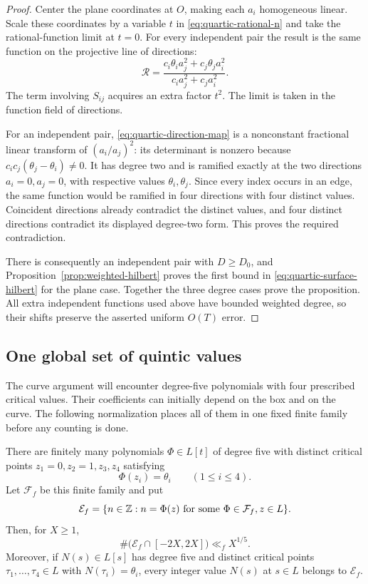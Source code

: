 \begin{proof}
Center the plane coordinates at $O$, making each $a_i$ homogeneous
linear.  Scale these coordinates by a variable $t$ in
\eqref{eq:quartic-rational-n} and take the rational-function limit at
$t=0$.  For every independent pair the result is the same function
on the projective line of directions:
\begin{equation}\label{eq:quartic-direction-map}
 \mathcal R=\frac{c_i\theta_i a_j^2+c_j\theta_j a_i^2}
          {c_i a_j^2+c_j a_i^2}.
\end{equation}
The term involving $S_{ij}$ acquires an extra factor $t^2$.
The limit is taken in the function field of directions.

For an independent pair, \eqref{eq:quartic-direction-map} is a
nonconstant fractional linear transform of $(a_i/a_j)^2$: its
determinant is nonzero because
$c_i c_j(\theta_j-\theta_i)\ne0$.  It has degree two and is ramified
exactly at the two directions $a_i=0,a_j=0$, with respective values
$\theta_i,\theta_j$.  Since every index occurs in an edge, the same
function would be ramified in four directions with four distinct
values.  Coincident directions already contradict the distinct values,
and four distinct directions contradict its displayed degree-two form.
This proves the required contradiction.

There is consequently an independent pair with $D\ge D_0$, and
Proposition~\ref{prop:weighted-hilbert} proves the first bound in
\eqref{eq:quartic-surface-hilbert} for the plane case.  Together the
three degree cases prove the proposition.  All extra independent
functions used above have bounded weighted degree, so their shifts
preserve the asserted uniform $O(T)$ error.
\end{proof}

\subsection{One global set of quintic values}

The curve argument will encounter degree-five polynomials with four
prescribed critical values.  Their coefficients can initially depend
on the box and on the curve.  The following normalization places all
of them in one fixed finite family before any counting is done.

\begin{proposition}\label{prop:quintic-discard}
There are finitely many polynomials $\Phi\in L[t]$ of degree five with
distinct critical points $z_1=0,z_2=1,z_3,z_4$ satisfying
\[
 \Phi(z_i)=\theta_i\qquad(1\le i\le4).
\]
Let $\mathcal F_f$ be this finite family and put
\[
 \mathcal E_f=
  \{n\in\mathbb Z:n=\Phi(z)\text{ for some }
                    \Phi\in\mathcal F_f, z\in L\}.
\]
Then, for $X\ge1$,
\begin{equation}\label{eq:quintic-discard-count}
 \#\bigl(\mathcal E_f\cap[-2X,2X]\bigr)\ll_f X^{1/5}.
\end{equation}
Moreover, if $N(s)\in L[s]$ has degree five and distinct critical
points $\tau_1,\ldots,\tau_4\in L$ with
$N(\tau_i)=\theta_i$, every integer value $N(s)$ at $s\in L$ belongs
to $\mathcal E_f$.
\end{proposition}

